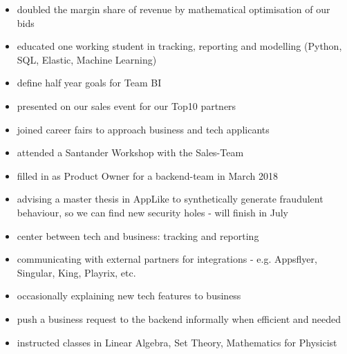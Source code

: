 \documentclass[a4paper]{twentysecondcv} %
\begin{document}
\begin{twenty} %
	{ 
    \begin{itemize}
    \item doubled the margin share of revenue by mathematical optimisation of our bids
    \item educated one working student in tracking, reporting and modelling (Python, SQL, Elastic, Machine Learning)
    \item define half year goals for Team BI
    \item presented on our sales event for our Top10 partners 
    \item joined career fairs to approach business and tech applicants
    \item attended a Santander Workshop with the Sales-Team
    \item filled in as Product Owner for a backend-team in March 2018

    \item advising a master thesis in AppLike to synthetically generate fraudulent
    behaviour, so we can find new security holes - will finish in July 
    \end{itemize}
    }
   	{
    \begin{itemize}
    \item center between tech and business: tracking and reporting 
    \item communicating with external partners for integrations - e.g. Appsflyer, Singular, King, Playrix, etc.
    \item occasionally explaining new tech features to business
    \item push a business request to the backend informally when efficient and needed
    \end{itemize}
    }
	{
    \begin{itemize}
    \item instructed classes in Linear Algebra, Set Theory, Mathematics for Physicist
    \end{itemize}
    }
\end{twenty}

\end{document}
